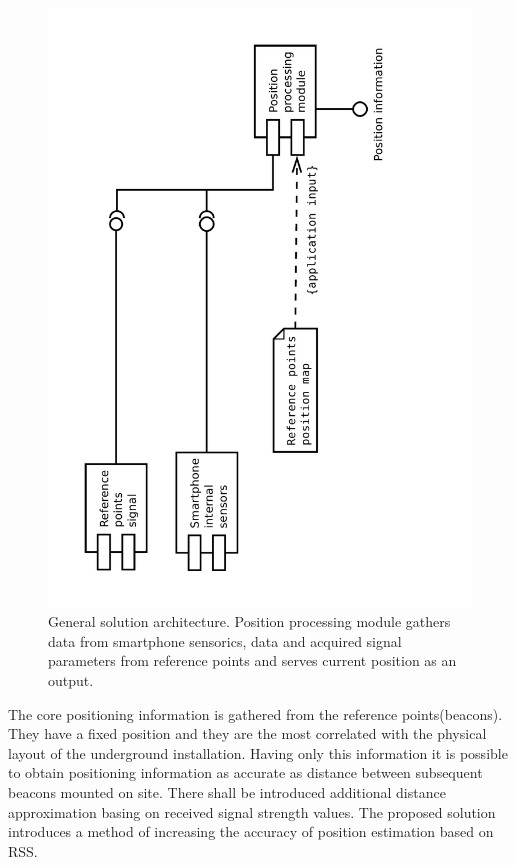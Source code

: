\documentclass[../main.tex]{subfiles}
\begin{document}
\begin{figure}[!htbp]
\includegraphics[height=\textwidth, angle=270, trim={0 0 4cm 0},clip]{pictures/architecture_general.pdf}
\centering
\caption{General solution architecture. Position processing module gathers data from smartphone sensorics, data and acquired signal parameters from reference points and serves current position as an output.}
\label{fig:architecture_general}
\end{figure}

The core positioning information is gathered from the reference points(beacons). They have a fixed position and they are the most correlated with the physical layout of the underground installation. Having only this information it is possible to obtain positioning information as accurate as distance between subsequent beacons mounted on site. There shall be introduced additional distance approximation basing on received signal strength values. The proposed solution introduces a method of increasing the accuracy of position estimation based on RSS.
\end{document}
